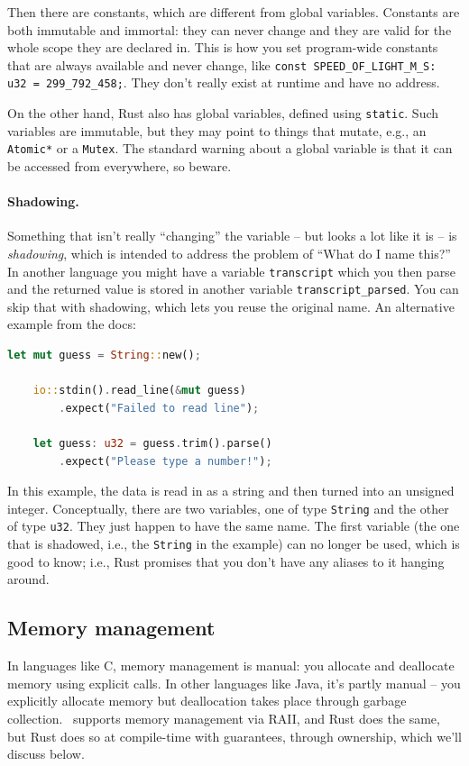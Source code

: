 Then there are constants, which are different from global variables. Constants are both immutable and immortal: they can never change and they are valid for the whole scope they are declared in. This is how you set program-wide constants that are always available and never change, like \texttt{const SPEED\_OF\_LIGHT\_M\_S: u32 = 299\_792\_458;}. They don't really exist at runtime and have no address.

On the other hand, Rust also has global variables, defined using \texttt{static}. Such variables are immutable, but they may point to things that mutate, e.g., an \texttt{Atomic*} or a \texttt{Mutex}. The standard warning about a global variable is that it can be accessed from everywhere, so beware.

\paragraph{Shadowing.}
Something that isn't really ``changing'' the variable -- but looks a lot like it is -- is \textit{shadowing}, which is intended to address the problem of ``What do I name this?'' In another language you might have a variable \texttt{transcript} which you then parse and the returned value is stored in another variable \texttt{transcript\_parsed}. You can skip that with shadowing, which lets you reuse the original name. An alternative example from the docs:

\begin{lstlisting}[language=Rust]
    let mut guess = String::new();

    io::stdin().read_line(&mut guess)
        .expect("Failed to read line");

    let guess: u32 = guess.trim().parse()
        .expect("Please type a number!");
\end{lstlisting}

In this example, the data is read in as a string and then turned into an unsigned integer. Conceptually, there are two variables, one of type \texttt{String} and the other of type \texttt{u32}. They just happen to have the same name. The first variable (the one that is shadowed, i.e., the \texttt{String} in the example) can no longer be used, which is good to know; i.e., Rust promises that you don't have any aliases to it hanging around.

\subsection*{Memory management}
In languages like C, memory management is manual: you allocate and deallocate memory using explicit calls. In other languages like Java, it's partly manual -- you explicitly allocate memory but deallocation takes place through garbage collection. \CPP~supports memory management via RAII, and Rust does the same, but Rust does so at compile-time with guarantees, through ownership, which we'll discuss below.

